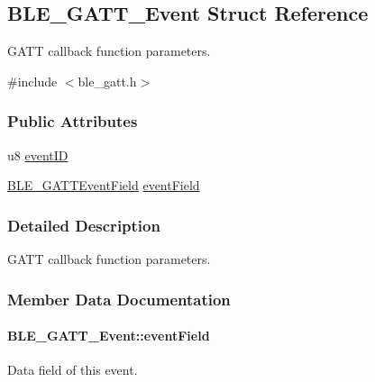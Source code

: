 \hypertarget{struct_b_l_e___g_a_t_t___event}{}\subsection{B\+L\+E\+\_\+\+G\+A\+T\+T\+\_\+\+Event Struct Reference}
\label{struct_b_l_e___g_a_t_t___event}


G\+A\+TT callback function parameters.  




{\ttfamily \#include $<$ble\+\_\+gatt.\+h$>$}

\subsubsection*{Public Attributes}
\begin{DoxyCompactItemize}
\item 
u8 \hyperlink{struct_b_l_e___g_a_t_t___event_a0608480c5fb5b2e11d65fc80191a2dad}{event\+ID}
\item 
\hyperlink{union_b_l_e___g_a_t_t_event_field}{B\+L\+E\+\_\+\+G\+A\+T\+T\+Event\+Field} \hyperlink{struct_b_l_e___g_a_t_t___event_a7dfc57120ff7007c697df1b821dd005b}{event\+Field}
\end{DoxyCompactItemize}


\subsubsection{Detailed Description}
G\+A\+TT callback function parameters. 

\subsubsection{Member Data Documentation}
\paragraph[{\texorpdfstring{event\+Field}{eventField}}]{ B\+L\+E\+\_\+\+G\+A\+T\+T\+\_\+\+Event\+::event\+Field}\hypertarget{struct_b_l_e___g_a_t_t___event_a7dfc57120ff7007c697df1b821dd005b}{}\label{struct_b_l_e___g_a_t_t___event_a7dfc57120ff7007c697df1b821dd005b}
Data field of this event. 
